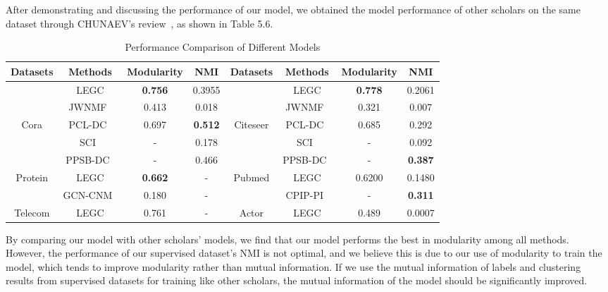 \documentclass[ %
                    author={Tengyao Tu},
                supervisor={Dr. James Pope},
                    degree={MSc},
                     title={A New Perspective on Graph Community Detection: Combining Traditional Methods with Deep Learning Approaches},
                  subtitle={Applying to Telecom Networks and Diverse Datasets},
                      type={},
                      year={2024}]{dissertation}
\begin{document}
After demonstrating and discussing the performance of our model, we obtained the model performance of other scholars on the same dataset through CHUNAEV's review~\cite{chunaev2020community}, as shown in Table 5.6.
\begin{table}[!htbp] 
\centering 
\label{Basic Infomation} 
\caption{Performance Comparison of Different Models} 
\vspace{5pt} 
\begin{tabular}{cccc|cccc} 
\hline 
Datasets &Methods&Modularity & NMI&Datasets &Methods&Modularity & NMI\\ 
\hline
& LEGC&\textbf{0.756}&0.3955&& LEGC &\textbf{0.778}&0.2061\\
 &JWNMF~\cite{huang2017joint}&0.413&0.018&&JWNMF~\cite{huang2017joint}&0.321&0.007\\
 Cora &PCL-DC~\cite{yang2009combining}&0.697&\textbf{0.512}&Citeseer &PCL-DC~\cite{yang2009combining}&0.685&0.292\\
 & SCI~\cite{wang2016semantic}&-&0.178&& SCI~\cite{wang2016semantic}&-&0.092\\
 & PPSB-DC~\cite{chai2013combining}&-&0.466&&PPSB-DC~\cite{chai2013combining}&-&\textbf{0.387}\\
\hline
Protein & LEGC & \textbf{0.662}&-&Pubmed&LEGC &0.6200&0.1480\\
& GCN-CNM~\cite{wilder2019end}&0.180&-&&CPIP-PI~\cite{liu2015community}&-&\textbf{0.311}\\
\hline
Telecom & LEGC &0.761&-&Actor & LEGC & 0.489&0.0007\\
\hline
\end{tabular}
\end{table}
By comparing our model with other scholars' models, we find that our model performs the best in modularity among all methods. However, the performance of our supervised dataset's NMI is not optimal, and we believe this is due to our use of modularity to train the model, which tends to improve modularity rather than mutual information. If we use the mutual information of labels and clustering results from supervised datasets for training like other scholars, the mutual information of the model should be significantly improved.
\end{document}
